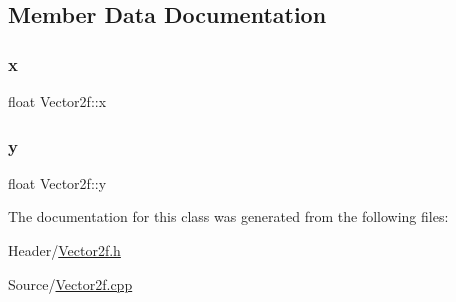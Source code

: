 \subsection{Member Data Documentation}
\mbox{\label{class_vector2f_add58d2378e3a3abdb76cf0ac51c9acfc}} 
\subsubsection{\texorpdfstring{x}{x}}
{\footnotesize\ttfamily float Vector2f\+::x}

\mbox{\label{class_vector2f_a14874a72597fd358b15f8ba34b999c4d}} 
\subsubsection{\texorpdfstring{y}{y}}
{\footnotesize\ttfamily float Vector2f\+::y}



The documentation for this class was generated from the following files\+:\begin{DoxyCompactItemize}
\item 
Header/\mbox{\hyperlink{_vector2f_8h}{Vector2f.\+h}}\item 
Source/\mbox{\hyperlink{_vector2f_8cpp}{Vector2f.\+cpp}}\end{DoxyCompactItemize}
